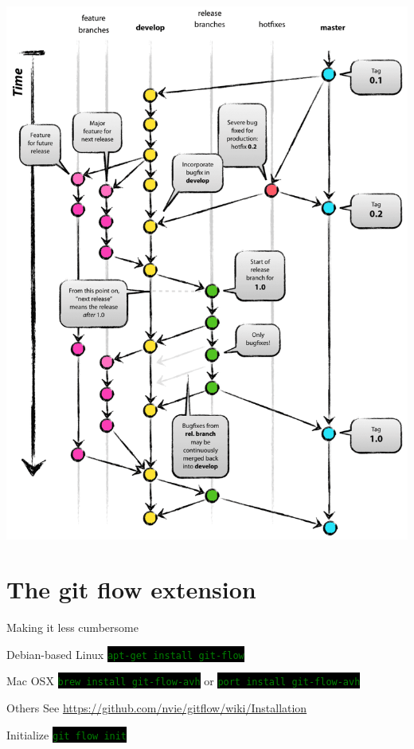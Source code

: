 \documentclass[
14pt,
aspectratio=169,
usenames,
dvipsnames,
x11names]{beamer}
\newcommand{\code}[1]{{\small\colorbox{black}{\textcolor{green}{\texttt{#1}}}}}
\begin{document}
\begin{frame}[plain]
  \centering
  \includegraphics[width=.48\textwidth]{git-model}
\end{frame}

\section{The git flow extension}

\begin{frame}{Making it less cumbersome}
  \begin{exampleblock}{Debian-based Linux}
    \code{apt-get install git-flow}
  \end{exampleblock}
  \begin{exampleblock}{Mac OSX}
    \code{brew install git-flow-avh}
    or
    \code{port install git-flow-avh}
  \end{exampleblock}
  \begin{exampleblock}{Others}
    See \url{https://github.com/nvie/gitflow/wiki/Installation}
  \end{exampleblock}
\end{frame}

\begin{frame}[fragile]{Initialize}
  \centering
  \code{git flow init}
\end{frame}
\end{document}
